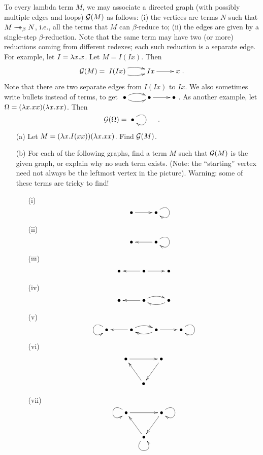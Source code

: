 \documentclass{article}
\begin{document}
\begin{exercise}
  To every lambda term $M$, we may associate a directed graph (with
  possibly multiple edges and loops) ${\cal G}(M)$ as follows: (i) the
  vertices are terms $N$ such that $M\mathrel{\rightarrow\!\!\!\!\!\rightarrow}_{\beta} N$, i.e., all the terms
  that $M$ can $\beta$-reduce to; (ii) the edges are given by a
  single-step $\beta$-reduction. Note that the same term may have two
  (or more) reductions coming from different redexes; each such
  reduction is a separate edge. For example, let $I=\lambda x.x$. Let
  $M=I(Ix)$. Then
  \[ \sG(M)=\xymatrix{I(Ix)\ar@/^/[r]\ar@/_/[r]&Ix\ar[r]&x}.
  \]
  Note that there are two separate edges from $I(Ix)$ to $Ix$.  We
  also sometimes write bullets instead of terms, to get $
  \xymatrix{\bullet\ar@/^/[r]\ar@/_/[r]&\bullet\ar[r]&\bullet}$.  As
  another example, let $\Omega=(\lambda x.xx)(\lambda x.xx)$. Then
  \[ \sG(\Omega) = \xymatrix{\bullet\ar@(ur,dr)[]&}.
  \]
  \begin{enumerate}
  \item[(a)] Let $M=(\lambda x.I(xx))(\lambda x.xx)$. Find ${\cal G}(M)$.
  \item[(b)] For each of the following graphs, find a term $M$ such
    that ${\cal G}(M)$ is the given graph, or explain why no such term
    exists. (Note: the ``starting'' vertex need not always be the
    leftmost vertex in the picture). Warning: some of these terms are
    tricky to find!
    \begin{enumerate}
    \item[(i)] \[ \xymatrix{\bullet\ar[r]&\bullet\ar@(ur,dr)[]} \]
    \item[(ii)] \[ \xymatrix{\bullet&\bullet\ar@(ur,dr)[]\ar[l]} \]
    \item[(iii)] \[ \xymatrix{\bullet&\bullet\ar[r]\ar[l]&\bullet} \]
    \item[(iv)] \[ \xymatrix{\bullet&\bullet\ar[l]\ar@/^/[r]&\bullet\ar@/^/[l]} \]
    \item[(v)] \[ \xymatrix{\bullet\ar@(ul,dl)[]&\bullet\ar@/^/[r]\ar[l]&\bullet\ar[r]\ar@/^/[l]&\bullet\ar@(ur,dr)[]} \]
    \item[(vi)] \[ \xymatrix@C-1em{\bullet\ar[rr]&&\bullet\ar[dl]\\&\bullet\ar[ul]}
      \]
    \item[(vii)] \[
      \xymatrix@C-1em{\bullet\ar@(ul,dl)[]\ar[rr]&&\bullet\ar@(ur,dr)[]\ar[dl]\\&\bullet\ar@(dl,dr)[]\ar[ul]}
      \]
    \end{enumerate}
  \end{enumerate}
\end{exercise}
\end{document}
